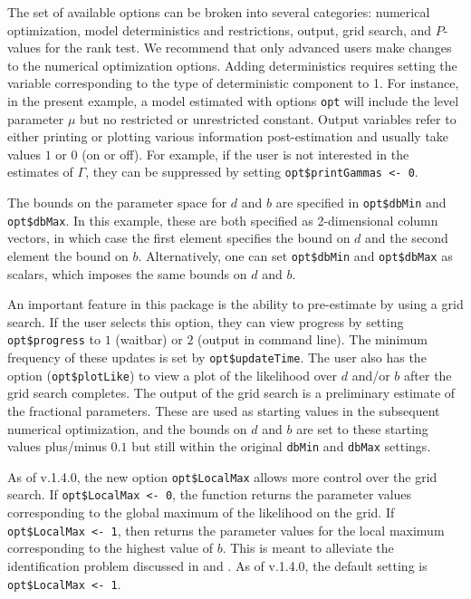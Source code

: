 \documentclass[article]{jss}
\newcommand{\fct}[1]{\code{#1()}}
\begin{document}
The set of available options can be broken into several categories: numerical optimization, model deterministics and restrictions, output, grid search, and $P$-values for the rank test. We recommend that only advanced users make changes to the numerical optimization options. Adding deterministics requires setting the variable corresponding to the type of deterministic component to 1. For instance, in the present example, a model estimated with options \verb|opt| will include the level parameter $\mu$ but no restricted or unrestricted constant. Output variables refer to either printing or plotting various information post-estimation and usually take values $1$ or $0$ (on or off). For example, if the user is not interested in the estimates of $\Gamma$, they can be suppressed by setting \verb|opt$printGammas <- 0|.

The bounds on the parameter space for $d$ and $b$ are specified in \verb|opt$dbMin| and \verb|opt$dbMax|. In this example, these are both specified as 2-dimensional column vectors, in which case the first element specifies the bound on $d$ and the second element the bound on $b$. Alternatively, one can set \verb|opt$dbMin| and \verb|opt$dbMax| as scalars, which imposes the same bounds on $d$ and $b$. 

An important feature in this package is the ability to pre-estimate by using a grid search. If the user selects this option, they can view progress by setting \verb|opt$progress| to $1$ (waitbar) or $2$ (output in command line). The minimum frequency of these updates is set by \verb|opt$updateTime|. The user also has the option (\verb|opt$plotLike|) to view a plot of the likelihood over $d$ and/or $b$ after the grid search completes. The output of the grid search is a preliminary estimate of the fractional parameters. These are used as starting values in the subsequent numerical optimization, and the bounds on $d$ and $b$ are set to these starting values plus/minus $0.1$ but still within the original \verb|dbMin| and \verb|dbMax| settings.

As of v.1.4.0, the new option \verb|opt$LocalMax| allows more control over the grid search. If \verb|opt$LocalMax <- 0|, the function \fct{FCVARlikeGrid} returns the parameter values corresponding to the global maximum of the likelihood on the grid. If \verb|opt$LocalMax <- 1|, then \fct{FCVARlikeGrid} returns the parameter values for the local maximum corresponding to the highest value of $b$. This is meant to alleviate the identification problem discussed in \citet[Section 2.3]{johniel2010} and \cite{Carlini2014}. As of v.1.4.0, the default setting is \verb|opt$LocalMax <- 1|.
\end{document}
